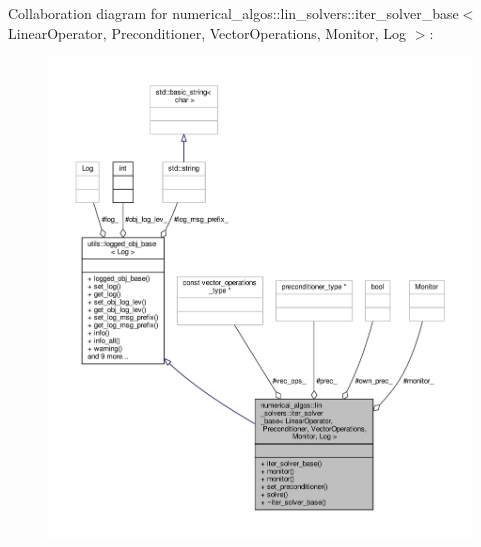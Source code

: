 Collaboration diagram for numerical\-\_\-algos\-:\-:lin\-\_\-solvers\-:\-:iter\-\_\-solver\-\_\-base$<$ Linear\-Operator, Preconditioner, Vector\-Operations, Monitor, Log $>$\-:
\nopagebreak
\begin{figure}[H]
\begin{center}
\leavevmode
\includegraphics[width=350pt]{classnumerical__algos_1_1lin__solvers_1_1iter__solver__base__coll__graph}
\end{center}
\end{figure}

